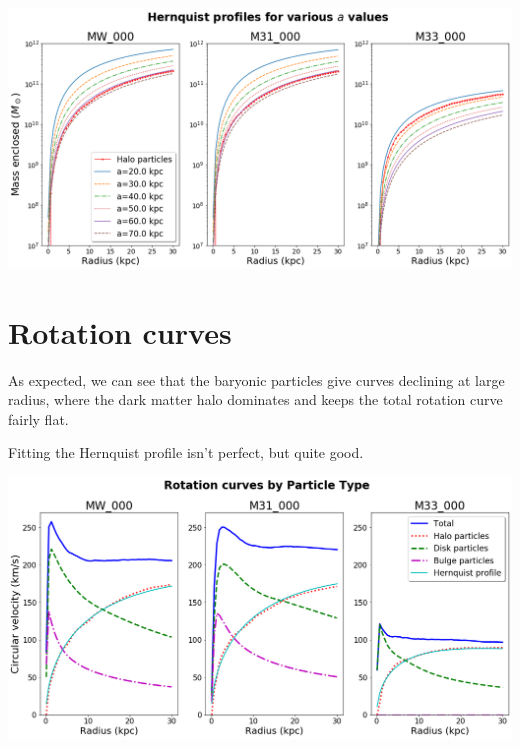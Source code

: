 { \par}\vspace{5mm}


{\centering \includegraphics[scale=0.45]{hernquist} \par}


\section*{Rotation curves}

As expected, we can see that the baryonic particles give curves declining at large radius, where the dark matter halo dominates and keeps the total rotation curve fairly flat.

Fitting the Hernquist profile isn't perfect, but quite good.\vspace{5mm}

{\centering \includegraphics[scale=0.45]{rotation} \par}




